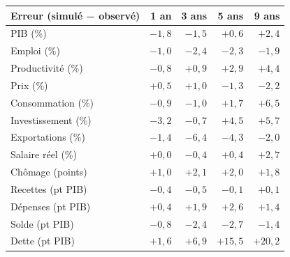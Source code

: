 \begin{tabular}{lrrrr}\toprule Erreur (simulé − observé) & 1 an & 3 ans & 5 ans & 9 ans\\ \midrule
PIB (\%) & $-1{,}8$ & $-1{,}5$ & $+0{,}6$ & $+2{,}4$\\
Emploi (\%) & $-1{,}0$ & $-2{,}4$ & $-2{,}3$ & $-1{,}9$\\
Productivité (\%) & $-0{,}8$ & $+0{,}9$ & $+2{,}9$ & $+4{,}4$\\
Prix (\%) & $+0{,}5$ & $+1{,}0$ & $-1{,}3$ & $-2{,}2$\\
Consommation (\%) & $-0{,}9$ & $-1{,}0$ & $+1{,}7$ & $+6{,}5$\\
Investissement (\%) & $-3{,}2$ & $-0{,}7$ & $+4{,}5$ & $+5{,}7$\\
Exportations (\%) & $-1{,}4$ & $-6{,}4$ & $-4{,}3$ & $-2{,}0$\\
Salaire réel (\%) & $+0{,}0$ & $-0{,}4$ & $+0{,}4$ & $+2{,}7$\\
Chômage (points) & $+1{,}0$ & $+2{,}1$ & $+2{,}0$ & $+1{,}8$\\
Recettes (pt PIB) & $-0{,}4$ & $-0{,}5$ & $-0{,}1$ & $+0{,}1$\\
Dépenses (pt PIB) & $+0{,}4$ & $+1{,}9$ & $+2{,}6$ & $+1{,}4$\\
Solde (pt PIB) & $-0{,}8$ & $-2{,}4$ & $-2{,}7$ & $-1{,}4$\\
Dette (pt PIB) & $+1{,}6$ & $+6{,}9$ & $+15{,}5$ & $+20{,}2$\\\bottomrule\end{tabular}